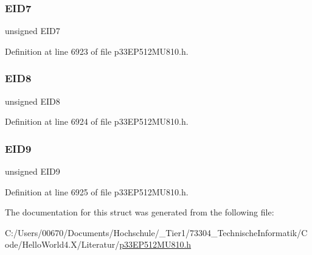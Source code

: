 \subsubsection{\texorpdfstring{E\+I\+D7}{EID7}}
{\footnotesize\ttfamily unsigned E\+I\+D7}



Definition at line 6923 of file p33\+E\+P512\+M\+U810.\+h.

\mbox{\label{structtag_c2_r_x_f12_e_i_d_b_i_t_s_acca25e0b7d86eb499d01f85222baea87}} 
\subsubsection{\texorpdfstring{E\+I\+D8}{EID8}}
{\footnotesize\ttfamily unsigned E\+I\+D8}



Definition at line 6924 of file p33\+E\+P512\+M\+U810.\+h.

\mbox{\label{structtag_c2_r_x_f12_e_i_d_b_i_t_s_ac6748f73d4ada8538b06548be4f396c2}} 
\subsubsection{\texorpdfstring{E\+I\+D9}{EID9}}
{\footnotesize\ttfamily unsigned E\+I\+D9}



Definition at line 6925 of file p33\+E\+P512\+M\+U810.\+h.



The documentation for this struct was generated from the following file\+:\begin{DoxyCompactItemize}
\item 
C\+:/\+Users/00670/\+Documents/\+Hochschule/\+\_\+\+Tier1/73304\+\_\+\+Technische\+Informatik/\+Code/\+Hello\+World4.\+X/\+Literatur/\hyperlink{p33_e_p512_m_u810_8h}{p33\+E\+P512\+M\+U810.\+h}\end{DoxyCompactItemize}
